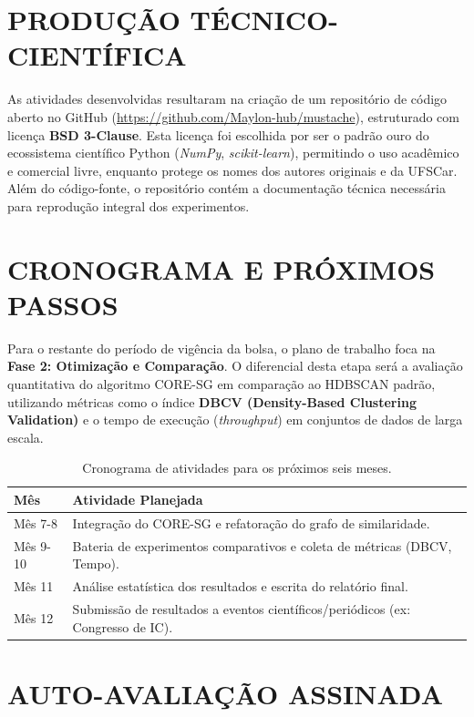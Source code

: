 \documentclass[12pt,a4paper]{article}
\begin{document}
\section{PRODUÇÃO TÉCNICO-CIENTÍFICA}

As atividades desenvolvidas resultaram na criação de um repositório de código aberto no GitHub (\url{https://github.com/Maylon-hub/mustache}), estruturado com licença \textbf{BSD 3-Clause}. Esta licença foi escolhida por ser o padrão ouro do ecossistema científico Python (\textit{NumPy}, \textit{scikit-learn}), permitindo o uso acadêmico e comercial livre, enquanto protege os nomes dos autores originais e da UFSCar. Além do código-fonte, o repositório contém a documentação técnica necessária para reprodução integral dos experimentos.

\section{CRONOGRAMA E PRÓXIMOS PASSOS}

Para o restante do período de vigência da bolsa, o plano de trabalho foca na \textbf{Fase 2: Otimização e Comparação}. O diferencial desta etapa será a avaliação quantitativa do algoritmo CORE-SG em comparação ao HDBSCAN padrão, utilizando métricas como o índice \textbf{DBCV (Density-Based Clustering Validation)} e o tempo de execução (\textit{throughput}) em conjuntos de dados de larga escala.

\begin{table}[H]
    \centering
    \caption{Cronograma de atividades para os próximos seis meses.}
    \begin{tabular}{@{}ll@{}}
    \toprule
    \textbf{Mês} & \textbf{Atividade Planejada} \\ \midrule
    Mês 7-8 & Integração do CORE-SG e refatoração do grafo de similaridade. \\
    Mês 9-10 & Bateria de experimentos comparativos e coleta de métricas (DBCV, Tempo). \\
    Mês 11 & Análise estatística dos resultados e escrita do relatório final. \\
    Mês 12 & Submissão de resultados a eventos científicos/periódicos (ex: Congresso de IC). \\ \bottomrule
    \end{tabular}
\end{table}

\section{AUTO-AVALIAÇÃO ASSINADA}
\end{document}
